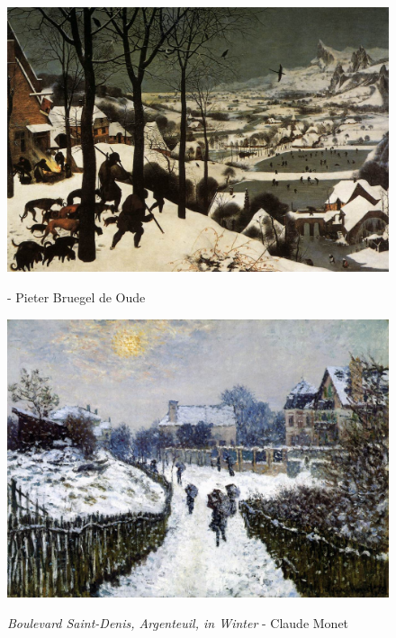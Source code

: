 \documentclass[a4paper]{article}
\begin{document}
\begin {figure}[h!]
\centering
\begin{minipage}[b]{.49\textwidth}
	\centering
	\includegraphics[width=\textwidth]{SnowPaintings/_Wth__The_Hunters_in_the_Snow__January__-_Bruegel.jpg}
    \caption{\emph{} - Pieter Bruegel de Oude}
\end{minipage}
\hfill
\begin{minipage}[b]{.49\textwidth}
	\centering
	\includegraphics[width=\textwidth]{SnowPaintings/_Wth__Boulevard_Saint-Denis__Argenteuil__in_Winter_-_Monet.jpg}
    \caption{\emph{Boulevard Saint-Denis, Argenteuil, in Winter} - Claude Monet}
\end{minipage}
\end{figure}
\end{document}
